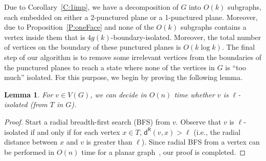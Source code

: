 \documentclass{article}
\newtheorem{lemma}[theorem]{Lemma}
\numberwithin{claimcounter}{lemma}
\begin{document}
Due to Corollary~\ref{C:1imp}, we have a decomposition of $G$ into  $O(k)$ subgraphs, each embedded on either a 2-punctured plane or a 1-punctured plane. Moreover, due to Proposition~\ref{P:oneFace} and  none of the $O(k)$ subgraphs contains a vertex inside them that is $4g(k)$-boundary-isolated. Moreover, the total number of vertices on the boundary of these punctured planes is $O (k \log k)$. The final step of our algorithm is to remove some irrelevant vertices from the boundaries of the punctured planes to reach a state where none of the vertices in $G$ is ``too much'' isolated. For this purpose, we begin by proving the following lemma. 
\begin{lemma}\label{L:boundary}
    For $v\in V(G)$, we can decide in $O(n)$ time whether $v$ is $\ell$-isolated (from $T$ in $G$).
\end{lemma}
\begin{proof}
    Start a radial breadth-first search (BFS) from $v$. Observe that $v$ is $\ell$-isolated if and only if for each vertex $x\in T$, $\mathsf{d^R}(v,x) > \ell$ (i.e., the radial distance between $x$ and $v$ is greater than $\ell$). Since radial BFS from a vertex can be performed in $O(n)$ time for a planar graph~\cite{CGBook}, our proof is completed. 
\end{proof}
\end{document}
